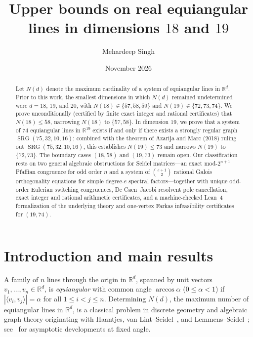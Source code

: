 \documentclass[11pt,reqno]{amsart}
\title[Upper bounds on equiangular lines in dimensions 18 and 19]{Upper bounds on real equiangular lines in dimensions \texorpdfstring{$18$}{18} and \texorpdfstring{$19$}{19}}
\author{Mehardeep Singh}
\date{November 2026}
\theoremstyle{definition}
\theoremstyle{remark}
\DeclareMathOperator{\SRG}{SRG}
\begin{document}
\begin{abstract}
Let $N(d)$ denote the maximum cardinality of a system of equiangular lines in $\mathbb{R}^d$. Prior to this work, the smallest dimensions in which $N(d)$ remained undetermined were $d = 18$, $19$, and $20$, with $N(18) \in \{57, 58, 59\}$ and $N(19) \in \{72, 73, 74\}$. We prove unconditionally (certified by finite exact integer and rational certificates) that $N(18) \le 58$, narrowing $N(18)$ to $\{57, 58\}$. In dimension $19$, we prove that a system of $74$ equiangular lines in $\mathbb{R}^{19}$ exists if and only if there exists a strongly regular graph $\SRG(75, 32, 10, 16)$; combined with the theorem of Azarija and Marc (2018) ruling out $\SRG(75, 32, 10, 16)$, this establishes $N(19) \le 73$ and narrows $N(19)$ to $\{72, 73\}$. The boundary cases $(18, 58)$ and $(19, 73)$ remain open. Our classification rests on two general algebraic obstructions for Seidel matrices---an exact mod-$2^{n+1}$ Pfaffian congruence for odd order $n$ and a system of $\binom{e+1}{2}$ rational Galois orthogonality equations for simple degree-$e$ spectral factors---together with unique odd-order Eulerian switching congruences, De Caen--Jacobi resolvent pole cancellation, exact integer and rational arithmetic certificates, and a machine-checked Lean~4 formalization of the underlying theory and one-vertex Farkas infeasibility certificates for $(19, 74)$.
\end{abstract}

\maketitle

\section{Introduction and main results}\label{sec:intro}

A family of $n$ lines through the origin in $\mathbb{R}^d$, spanned by unit vectors $v_1, \dots, v_n \in \mathbb{R}^d$, is \emph{equiangular} with common angle $\arccos\alpha$ ($0 \le \alpha < 1$) if $|\langle v_i, v_j \rangle| = \alpha$ for all $1 \le i < j \le n$. Determining $N(d)$, the maximum number of equiangular lines in $\mathbb{R}^d$, is a classical problem in discrete geometry and algebraic graph theory originating with Haantjes, van Lint--Seidel~\cite{vanLintSeidel1966}, and Lemmens--Seidel~\cite{LemmensSeidel1973}; see~\cite{Bukh2016,BDKS2018,JTYZZ2021} for asymptotic developments at fixed angle.
\end{document}
